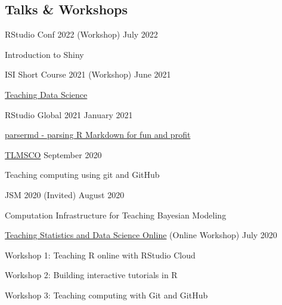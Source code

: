 \documentclass[margin,line]{res}
\begin{document}
\begin{resume}
\vspace{4mm}

%

\pagebreak

\section{\sc Talks \& Workshops}


RStudio Conf 2022 (Workshop) \hfill July 2022
\begin{list1}
\item[] Introduction to Shiny
\end{list1}
\vspace{-3mm}

ISI Short Course 2021 (Workshop) \hfill June 2021
\begin{list1}
\item[] \href{https://mine-cetinkaya-rundel.github.io/teach-ds-wsc-2021/}{Teaching Data Science}
\end{list1}
\vspace{-3mm}

RStudio Global 2021 \hfill January 2021
\begin{list1}
\item[] \href{https://www.rstudio.com/resources/rstudioglobal-2021/parsermd-parsing-r-markdown-for-fun-and-profit/}{parsermd - parsing R Markdown for fun and profit}
\end{list1}
\vspace{-3mm}

\href{https://sites.google.com/view/rssteachingstatisticssig/research-meetings/teaching-and-learning-of-maths-and-stats-computing-online}{TLMSCO} \hfill September 2020
\begin{list1}
\item[] Teaching computing using git and GitHub
\end{list1}
\vspace{-3mm}

JSM 2020 (Invited) \hfill August 2020
\begin{list1}
\item[] Computation Infrastructure for Teaching Bayesian Modeling
\end{list1}
\vspace{-3mm}

\href{http://bit.ly/teach-r-online-mats}{Teaching Statistics and Data Science Online} (Online Workshop) \hfill July 2020
\begin{list1}
\item[] Workshop 1: Teaching R online with RStudio Cloud
\item[] Workshop 2: Building interactive tutorials in R
\item[] Workshop 3: Teaching computing with Git and GitHub
\end{list1} 
\vspace{-3mm}





\end{resume}
\end{document}
